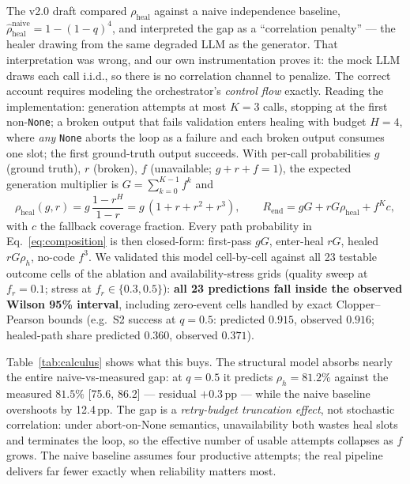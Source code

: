 ﻿\documentclass[12pt,a4paper]{article}
\begin{document}
The v2.0 draft compared $\rho_{\mathrm{heal}}$ against a naive independence baseline, $\hat\rho^{\mathrm{naive}}_{\mathrm{heal}} = 1-(1-q)^{4}$, and interpreted the gap as a ``correlation penalty'' --- the healer drawing from the same degraded LLM as the generator. That interpretation was wrong, and our own instrumentation proves it: the mock LLM draws each call i.i.d., so there is no correlation channel to penalize. The correct account requires modeling the orchestrator's \emph{control flow} exactly. Reading the implementation: generation attempts at most $K=3$ calls, stopping at the first non-\texttt{None}; a broken output that fails validation enters healing with budget $H=4$, where \emph{any} \texttt{None} aborts the loop as a failure and each broken output consumes one slot; the first ground-truth output succeeds. With per-call probabilities $g$ (ground truth), $r$ (broken), $f$ (unavailable; $g{+}r{+}f{=}1$), the expected generation multiplier is $G=\sum_{k=0}^{K-1}f^k$ and
\begin{equation}
\rho_{\mathrm{heal}}(g,r) = g\,\frac{1-r^{H}}{1-r} = g\,(1 + r + r^2 + r^3),
\qquad
R_{\mathrm{end}} = gG + rG\rho_{\mathrm{heal}} + f^{K}c,
\label{eq:rheal}
\end{equation}
with $c$ the fallback coverage fraction. Every path probability in Eq.~\eqref{eq:composition} is then closed-form: first-pass $gG$, enter-heal $rG$, healed $rG\rho_h$, no-code $f^3$. We validated this model cell-by-cell against all 23 testable outcome cells of the ablation and availability-stress grids (quality sweep at $f_r{=}0.1$; stress at $f_r\in\{0.3,0.5\}$): \textbf{all 23 predictions fall inside the observed Wilson 95\% interval}, including zero-event cells handled by exact Clopper--Pearson bounds (e.g.\ S2 success at $q{=}0.5$: predicted $0.915$, observed $0.916$; healed-path share predicted $0.360$, observed $0.371$).

Table~\ref{tab:calculus} shows what this buys. The structural model absorbs nearly the entire naive-vs-measured gap: at $q{=}0.5$ it predicts $\rho_h = 81.2\%$ against the measured $81.5\%$ [75.6, 86.2] --- residual $+0.3$\,pp --- while the naive baseline overshoots by 12.4\,pp. The gap is a \emph{retry-budget truncation effect}, not stochastic correlation: under abort-on-None semantics, unavailability both wastes heal slots and terminates the loop, so the effective number of usable attempts collapses as $f$ grows. The naive baseline assumes four productive attempts; the real pipeline delivers far fewer exactly when reliability matters most.
\end{document}

